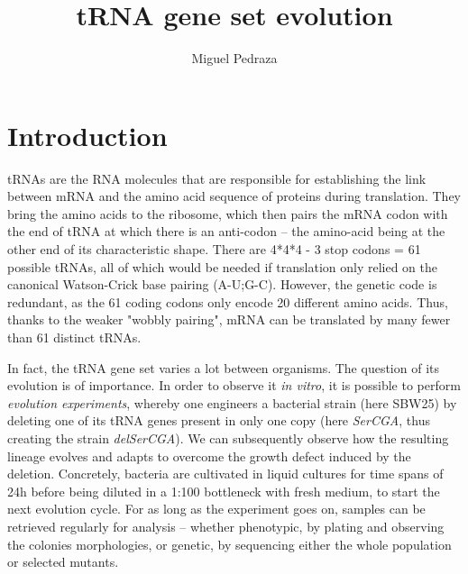 \documentclass[10pt,a4paper]{scrartcl}
\title{tRNA gene set evolution}
\author[1]{Miguel Pedraza}
\affil[1]{Aix-Marseille Université, France}
\begin{document}
\maketitle
\tableofcontents
\newpage



\section{Introduction}

tRNAs are the RNA molecules that are responsible for establishing the link between mRNA and the amino acid sequence of proteins during translation. They bring the amino acids to the ribosome, which then pairs the mRNA codon with the end of tRNA at which there is an anti-codon -- the amino-acid being at the other end of its characteristic shape. 
There are 4*4*4 - 3 stop codons = 61 possible tRNAs, all of which would be needed if translation only relied on the canonical Watson-Crick base pairing (A-U;G-C).
However, the genetic code is redundant, as the 61 coding codons only encode 20 different amino acids. Thus, thanks to the weaker "wobbly pairing", mRNA can be translated by many fewer than 61 distinct tRNAs.

In fact, the tRNA gene set varies a lot between organisms. The question of its evolution is of importance.
In order to observe it \textit{in vitro}, it is possible to perform \textit{evolution experiments}, whereby one engineers a bacterial strain (here SBW25) by deleting one of its tRNA genes present in only one copy (here \textit{SerCGA}, thus creating the strain \textit{delSerCGA}). We can subsequently observe how the resulting lineage evolves and adapts to overcome the growth defect induced by the deletion.  Concretely, bacteria are cultivated in liquid cultures for time spans of 24h before being diluted in a 1:100 bottleneck with fresh medium, to start the next evolution cycle.  For as long as the experiment goes on, samples can be retrieved regularly for analysis -- whether phenotypic, by plating and observing the colonies morphologies, or genetic, by sequencing either the whole population or selected mutants. 
\end{document}
